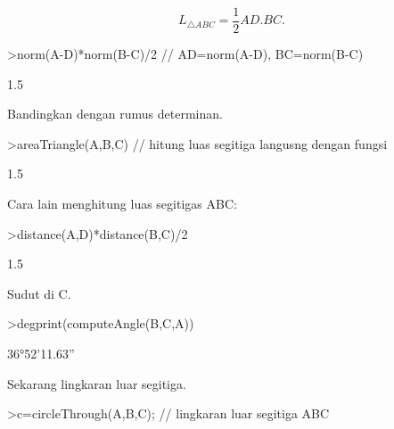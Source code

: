 \documentclass[a4paper,10pt]{article}
\begin{document}
\begin{eulernotebook}
\begin{eulercomment}
\begin{eulercomment}
\begin{eulercomment}
\begin{eulercomment}
\begin{eulercomment}
\begin{eulercomment}
\begin{eulercomment}
\begin{eulercomment}
\begin{eulercomment}
\begin{eulercomment}
\begin{eulercomment}
\begin{eulercomment}
\begin{eulercomment}
\begin{eulercomment}
\begin{eulercomment}
\begin{eulercomment}
\begin{eulercomment}
\begin{eulercomment}
\begin{eulercomment}
\begin{eulercomment}
\begin{eulercomment}
\begin{eulercomment}
\begin{eulercomment}
\begin{eulercomment}
\begin{eulercomment}
\begin{eulercomment}
\begin{eulercomment}
\begin{eulercomment}
\begin{eulercomment}
\begin{eulercomment}
\begin{eulercomment}
\end{eulercomment}
\begin{eulerformula}
\[
L_{\triangle ABC}= \frac{1}{2}AD.BC.
\]
\end{eulerformula}
\begin{eulerprompt}
>norm(A-D)*norm(B-C)/2 // AD=norm(A-D), BC=norm(B-C)
\end{eulerprompt}
\begin{euleroutput}
  1.5
\end{euleroutput}
\begin{eulercomment}
Bandingkan dengan rumus determinan.
\end{eulercomment}
\begin{eulerprompt}
>areaTriangle(A,B,C) // hitung luas segitiga langusng dengan fungsi
\end{eulerprompt}
\begin{euleroutput}
  1.5
\end{euleroutput}
\begin{eulercomment}
Cara lain menghitung luas segitigas ABC:
\end{eulercomment}
\begin{eulerprompt}
>distance(A,D)*distance(B,C)/2
\end{eulerprompt}
\begin{euleroutput}
  1.5
\end{euleroutput}
\begin{eulercomment}
Sudut di C.
\end{eulercomment}
\begin{eulerprompt}
>degprint(computeAngle(B,C,A))
\end{eulerprompt}
\begin{euleroutput}
  36°52'11.63''
\end{euleroutput}
\begin{eulercomment}
Sekarang lingkaran luar segitiga.
\end{eulercomment}
\begin{eulerprompt}
>c=circleThrough(A,B,C); // lingkaran luar segitiga ABC

\end{eulerprompt}
\end{eulercomment}
\end{eulercomment}
\end{eulercomment}
\end{eulercomment}
\end{eulercomment}
\end{eulercomment}
\end{eulercomment}
\end{eulercomment}
\end{eulercomment}
\end{eulercomment}
\end{eulercomment}
\end{eulercomment}
\end{eulercomment}
\end{eulercomment}
\end{eulercomment}
\end{eulercomment}
\end{eulercomment}
\end{eulercomment}
\end{eulercomment}
\end{eulercomment}
\end{eulercomment}
\end{eulercomment}
\end{eulercomment}
\end{eulercomment}
\end{eulercomment}
\end{eulercomment}
\end{eulercomment}
\end{eulercomment}
\end{eulercomment}
\end{eulercomment}
\end{eulernotebook}
\end{document}
